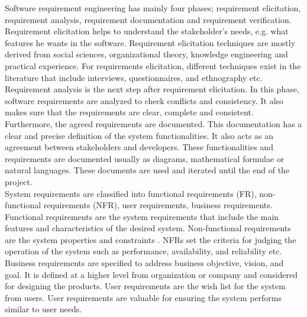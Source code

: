 	 Software requirement engineering has mainly four phases; requirement elicitation, requirement
analysis, requirement documentation and requirement verification\cite{Kotonya:1998}. Requirement elicitation
\cite {Coughlan:2002} \cite {Zowghi2005} helps to understand the stakeholder's needs, e.g. what features he wants in the software.
Requirement elicitation techniques are mostly derived from social sciences, organizational
theory, knowledge engineering and practical experience. For requirements elicitation, different
techniques exist in the literature that include interviews, questionnaires, and ethnography etc.
Requirement analysis \cite{Nuseibeh:2000} is the next step after requirement elicitation. In this phase, software
requirements are analyzed to check conflicts and consistency. It also makes
sure that the requirements are clear, complete and consistent. Furthermore, the agreed
requirements are documented. This documentation has a clear and precise definition of the
system functionalities. It also acts as an agreement between stakeholders and developers. These
functionalities and requirements are documented usually as diagrams, mathematical formulae
or natural languages. These documents are used and iterated until the end of the project.\\

	System requirements are classified into functional requirements (FR), non-functional requirements (NFR), user requirements, business requirements. Functional requirements are the system requirements that include the main
features and characteristics of the desired system. Non-functional requirements are the system
properties and constraints \cite{Davis:1993} \cite{Glinz}. NFRs set the criteria for judging the operation of the system such as performance, availability, and reliability etc. Business requirements are specified to address business objective, vision, and goal. It is defined at a higher level from organization or company and considered for designing the products. User requirements are the wish list for the system from users. User requirements are valuable for ensuring the system performs similar to user needs.\\

